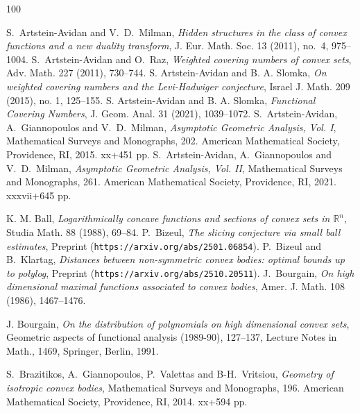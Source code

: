 \documentclass[11pt,leqno]{article}
\theoremstyle{definition}
\theoremstyle{remark}
\numberwithin{equation}{section}
\begin{document}
\footnotesize

\begin{thebibliography}{100}
\footnotesize



 \textrm{S.\ Artstein-Avidan and V.~D.~Milman},
\textit{Hidden structures in the class of convex functions and a new duality transform}, 
J. Eur. Math. Soc. 13 (2011), no.~4, 975--1004.
 \textrm{S.\ Artstein-Avidan and O.\ Raz}, 
\textit{Weighted covering numbers of convex sets}, Adv. Math. 227 (2011), 730--744. 
 \textrm{S. Artstein-Avidan and B. A. Slomka}, \textit{On weighted covering numbers and the Levi-Hadwiger
conjecture}, Israel J. Math. 209 (2015), no. 1, 125--155.
 \textrm{S. Artstein-Avidan and B. A. Slomka}, 
\textit{Functional Covering Numbers}, J. Geom. Anal. 31 (2021), 1039--1072.
 \textrm{S.\ Artstein-Avidan, A.\ Giannopoulos and V.\ D.\ Milman},
\textit{Asymptotic Geometric Analysis, Vol. I}, Mathematical Surveys and Monographs, 202.
American Mathematical Society, Providence, RI, 2015. xx+451 pp.
 \textrm{S.\ Artstein-Avidan, A.\ Giannopoulos and V.\ D.\ Milman},
\textit{Asymptotic Geometric Analysis, Vol. II}, Mathematical Surveys and Monographs, 261.
American  Mathematical Society, Providence, RI, 2021. xxxvii+645 pp.

 \textrm{K. M. Ball}, \textit{Logarithmically concave functions and sections of convex sets in ${\mathbb R}^n$},
Studia Math. {88} (1988), 69--84.
 \textrm{P.\ Bizeul}, \textit{The slicing conjecture via small ball estimates},
Preprint ({\tt https://arxiv.org/abs/2501.06854}).
 \textrm{P.\ Bizeul and B.\ Klartag}, \textit{Distances between non-symmetric convex bodies: optimal bounds up to polylog},
Preprint ({\tt https://arxiv.org/abs/2510.20511}).
 \textrm{J.\ Bourgain}, \textit{On high dimensional
maximal functions associated to convex bodies}, Amer. J. Math. {108} (1986), 1467--1476.

 \textrm{J. Bourgain}, \textit{On the distribution of polynomials on high dimensional convex sets},
Geometric aspects of functional analysis (1989-90), 127--137, Lecture Notes in Math., 1469, Springer, Berlin, 1991.

 \textrm{S.\ Brazitikos, A.\ Giannopoulos, P.\ Valettas and B-H.\ Vritsiou},
\textit{Geometry of isotropic convex bodies}, Mathematical Surveys and Monographs, 196.
American Mathematical Society, Providence, RI, 2014. xx+594 pp.



\end{thebibliography}
\end{document}
